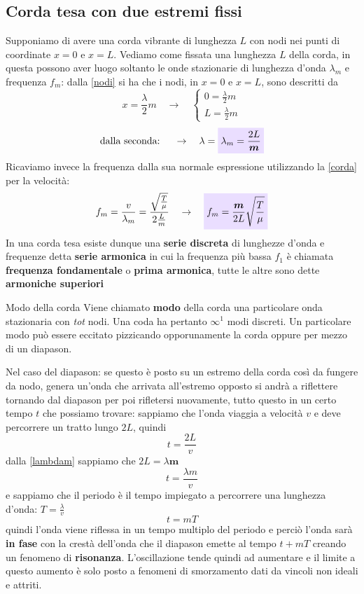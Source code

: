 \documentclass[x11names]{report}
\newcommand{\viola}[1]{\colorbox{yred}{$\displaystyle #1$}}
\begin{document}
	\subsection{Corda tesa con due estremi fissi}
	Supponiamo di avere una corda vibrante di lunghezza \(L\) con nodi nei punti di coordinate \(x=0\) e \(x=L\). Vediamo come fissata una lunghezza \(L\) della corda, in questa possono aver luogo soltanto le onde stazionarie di lunghezza d'onda \(\lambda_m\) e frequenza \(f_m\): dalla \ref{nodi} si ha che i nodi, in \(x=0\) e \(x=L\), sono descritti da
	\[ 
	x = \frac{\lambda}{2}m \quad \rightarrow \quad \begin{cases}
		0 = \frac{\lambda}{2}m\\ L = \frac{\lambda}{2}m
	\end{cases}
	\]
	\begin{equation}\label{lambdam}
		\text{dalla seconda: }\quad \to \quad \lambda = \viola{\lambda_m = \frac{2L}{\boldsymbol{m}}}
	\end{equation}
	Ricaviamo invece la frequenza dalla sua normale espressione utilizzando la \ref{corda} per la velocità:
	\[ 
	f_m = \frac{v}{\lambda_m} = \frac{\sqrt{\frac{T}{\mu}}}{2\frac{L}{m}} \quad \rightarrow \quad  \viola{f_m = \frac{\boldsymbol{m}}{2L}\sqrt{\frac{T}{\mu}}}
	\]
	In una corda tesa esiste dunque una \textbf{serie discreta} di lunghezze d'onda e frequenze detta \textbf{serie armonica} in  cui  la frequenza più bassa  \(f_1\) è chiamata \textbf{frequenza fondamentale} o \textbf{prima armonica}, tutte le altre sono dette \textbf{armoniche superiori}
	
	\begin{center}
		\colorbox{yblue}{\begin{minipage}{5.75in}
				\begin{blues}{Modo della corda}
					Viene chiamato \textbf{modo} della corda una particolare onda stazionaria con \textit{tot} nodi. Una coda ha pertanto \(\infty^1\) modi discreti. Un particolare modo può essere eccitato pizzicando opporunamente la corda oppure per mezzo di un diapason.
				\end{blues}
		\end{minipage}}
	\end{center}
	
	
	Nel caso del diapason: se questo è posto su un estremo della corda così da fungere da nodo, genera un'onda che arrivata all'estremo opposto si andrà a riflettere tornando dal diapason per poi rifletersi nuovamente, tutto questo in un certo tempo \(t\) che possiamo trovare: sappiamo che l'onda viaggia a velocità \(v\) e deve percorrere un tratto lungo \(2L\), quindi 
	\[ 
	t = \frac{2L}{v}
	\]
	dalla \ref{lambdam} sappiamo che \(2L = \lambda \boldsymbol{m}\)
	\[ 
	t = \frac{\lambda m}{v}
	\]
	e sappiamo che il periodo è il tempo impiegato a percorrere una lunghezza d'onda: \(T = \frac{\lambda}{v}\)
	\[ 
	t = mT
	\]
	quindi l'onda viene riflessa in un tempo multiplo del periodo e perciò l'onda sarà \textbf{in fase} con la crestà dell'onda che il diapason emette al tempo \(t + mT\) creando un fenomeno di \textbf{risonanza}. L'oscillazione tende quindi ad aumentare e il limite a questo aumento è solo posto a fenomeni di smorzamento dati da vincoli non ideali e attriti.
	
\end{document}
